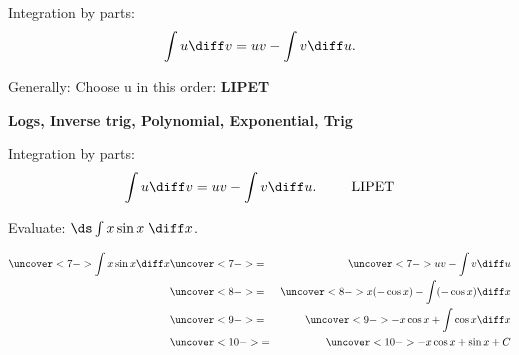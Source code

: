 


\begin{frame}
Integration by parts:
\belowdisplayskip=0pt
\abovedisplayskip=0pt
\[
\int u\diff v = uv - \int v\diff u.
\]

\begin{center}
Generally: Choose u in this order: {\Large \textbf{  LIPET}}
\end{center}
\pause

\begin{center}
{\Large \textbf{  Logs, Inverse trig, Polynomial, Exponential, Trig
}}
\end{center}
\end{frame}

\begin{frame}
Integration by parts:
\belowdisplayskip=0pt
\abovedisplayskip=0pt
\[
\int u\diff v = uv - \int v\diff u.\;\;\;\;\;\;\;\;\;\textrm{LIPET}
\]
\begin{example} %
Evaluate: $\ds \int x\sin x\; \diff x$. \\


%

\begin{eqnarray*}
\uncover<7->{\int x\sin x\diff x} & \uncover<7->{ = } & \uncover<7->{uv - \int v\diff u}\\
 & \uncover<8->{ = } & %
\uncover<8->{x(-\cos x) - \int (-\cos x)\diff x}\\
 & \uncover<9->{ = } & %
\uncover<9->{-x\cos x + \int \cos x\diff x}\\
 & \uncover<10->{ = } & %
\uncover<10->{-x\cos x + \sin x + C}\\
\end{eqnarray*}

\end{example}
\end{frame}
